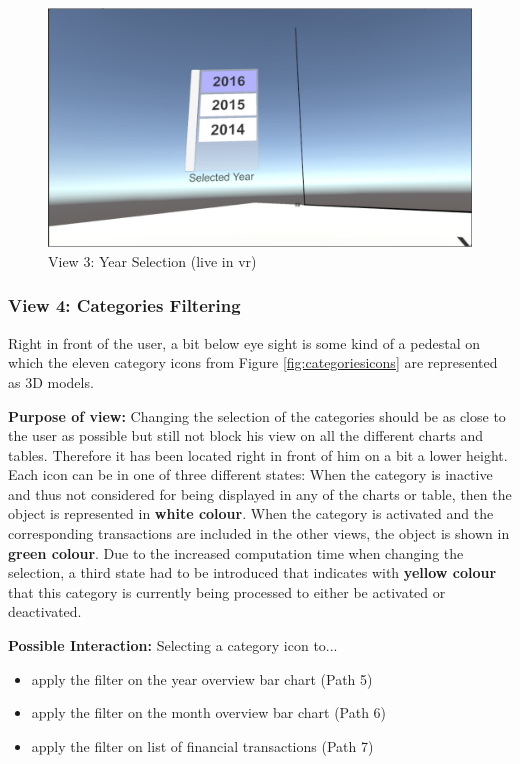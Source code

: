 \begin{figure}[h]
	\begin{center}
		\includegraphics[width=12cm]{03_Figures/08_Development/View3_YearSelection.png}
		\caption{View 3: Year Selection (live in \gls{vr})}
		\label{fig:unityview3}
	\end{center}
\end{figure}


\subsubsection{View 4: Categories Filtering}

Right in front of the user, a bit below eye sight is some kind of a pedestal on which the eleven category icons from Figure \ref{fig:categoriesicons} are represented as 3D models. 

\textbf{Purpose of view:} Changing the selection of the categories should be as close to the user as possible but still not block his view on all the different charts and tables. Therefore it has been located right in front of him on a bit a lower height. Each icon can be in one of three different states: When the category is inactive and thus not considered for being displayed in any of the charts or table, then the object is represented in \textbf{white colour}. When the category is activated and the corresponding transactions are included in the other views, the object is shown in \textbf{green colour}. Due to the increased computation time when changing the selection, a third state had to be introduced that indicates with \textbf{yellow colour} that this category is currently being processed to either be activated or deactivated.

\textbf{Possible Interaction:} Selecting a category icon to...
\begin{itemize}[noitemsep,nolistsep]
	\item apply the filter on the year overview bar chart (Path 5)
	\item apply the filter on the month overview bar chart (Path 6)
	\item apply the filter on list of financial transactions (Path 7)
\end{itemize}

